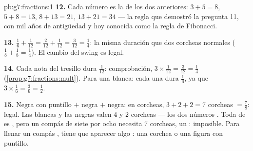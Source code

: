 \begin{solution}{pb:g7:fractions:1}
\textbf{12.} Cada número es la  de los dos anteriores:
$3 + 5 = 8$, $5 + 8 = 13$, $8 + 13 = 21$, $13 + 21 = 34$ ---
la regla que demostró la pregunta 11, con mil años de antigüedad y hoy conocida
como la regla de Fibonacci.

\textbf{13.} $\frac16 + \frac{1}{12} = \frac{2}{12} +
\frac{1}{12} = \frac{3}{12} = \frac14$: la misma duración que
dos corcheas normales ($\frac18 + \frac18 = \frac14$). El cambio
del swing es legal.

\textbf{14.} Cada nota del tresillo dura $\frac{1}{12}$: comprobación,
$3 \times \frac{1}{12} = \frac{3}{12} = \frac14$
(\cref{prop:g7:fractions:mult}). Para una blanca: cada una dura
$\frac16$, ya que $3 \times \frac16 = \frac36 = \frac12$.

\textbf{15.} Negra con puntillo $+$ negra $+$ negra: en corcheas,
$3 + 2 + 2 = 7$ corcheas $= \frac78$: legal. Las blancas y las negras
valen $4$ y $2$ corcheas --- los dos números \emph{}. Toda
 de  es , pero un compás de siete por ocho necesita
$7$ corcheas, un : imposible. Para llenar un compás ,
tiene que aparecer algo : una corchea o una figura con puntillo.
\end{solution}
